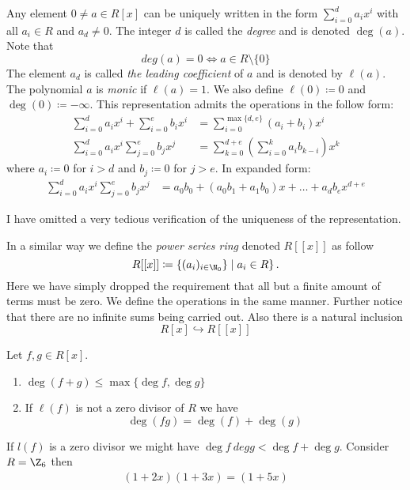 \documentclass[master.tex]{subfiles}
\newcommand{\poly}[3]{\sum_{#1=0}^#3 {#2}_{#1}x^{#1}}
\begin{document}
\begin{defn}
  Any element \(0 \neq a \in R[x]\) can be uniquely written in the form \(\poly{i}{a}{d}\) with all \(a_i \in R\) and
  \(a_d \neq 0\). The integer \(d\) is called the \emph{degree} and is denoted \(\deg(a)\). Note that
  \[deg(a) = 0 \iff a \in R \setminus \{0\}\] The element \(a_d\) is called \emph{the leading coefficient} of \(a\) and
  is denoted by \(\ell(a)\). The polynomial \(a\) is \emph{monic} if \(\ell(a)=1\). We also define
  \(\ell(0) \coloneqq 0\) and \(\deg(0) \coloneqq - \infty\). This representation admits the operations in the follow
  form:
  \begin{align*}
    \poly{i}{a}{d}+\poly{i}{b}{e} &= \sum_{i=0}^{\max\{d,e\}}(a_i+b_i)x^i\\
    \poly{i}{a}{d}\poly{j}{b}{e}  &= \sum_{k=0}^{d+e}\left(\sum_{i=0}^k a_i b_{k-i}\right)x^k
  \end{align*}
  where \(a_i \coloneqq 0\) for \(i > d\) and \(b_j \coloneqq 0\) for \(j > e\). In expanded form:
  \begin{align*}
    \poly{i}{a}{d}\poly{j}{b}{e} &= a_0 b_0 + (a_0 b_1 + a_1 b_0)x + \ldots + a_db_e x^{d+e}
  \end{align*}
\end{defn}
I have omitted a very tedious verification of the uniqueness of the representation.
\begin{rmk}
  In a similar way we define the \emph{power series ring} denoted \(R[[x]]\) as follow
  \[R[[x]] \coloneqq \left\{(a_i)_{i \in \N_0}\} \mid a_i \in R\right\}.\] Here we have simply dropped the requirement
  that all but a finite amount of terms must be zero. We define the operations in the same manner. Further notice that
  there are no infinite sums being carried out. Also there is a natural inclusion
  \[R[x] \hookrightarrow R[[x]]\]
\end{rmk}

\begin{lem}
  Let \(f,g \in R[x]\).
  \begin{enumerate}[label=(\alph*)]
  \item \(\deg(f+g) \le \max \{\deg f, \deg g\}\)
  \item If \(\ell(f)\) is not a zero divisor of \(R\) we have
    \[\deg(fg) = \deg(f)+\deg(g)\]
  \end{enumerate}
\end{lem}


\begin{example*}
  If \(l(f)\) is a zero divisor we might have \(\deg f \ deg g < \deg f + \deg g\). Consider \(R = \Z_6\) then
  \begin{align*}
    (1+2x)(1+3x) = (1+5x)
  \end{align*}
\end{example*}
\end{document}
